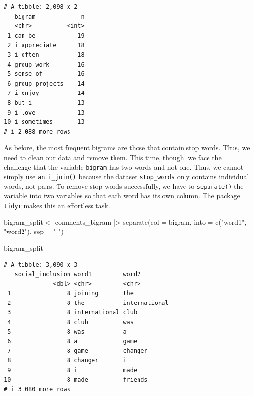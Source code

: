 \documentclass[
  letterpaper,
]{krantz}
\makeatletter
\newenvironment{Shaded}{\begin{snugshade}}{\end{snugshade}}
\newcommand{\AttributeTok}[1]{\textcolor[rgb]{0.40,0.45,0.13}{#1}}
\newcommand{\FunctionTok}[1]{\textcolor[rgb]{0.28,0.35,0.67}{#1}}
\newcommand{\NormalTok}[1]{\textcolor[rgb]{0.00,0.23,0.31}{#1}}
\newcommand{\OtherTok}[1]{\textcolor[rgb]{0.00,0.23,0.31}{#1}}
\newcommand{\SpecialCharTok}[1]{\textcolor[rgb]{0.37,0.37,0.37}{#1}}
\newcommand{\StringTok}[1]{\textcolor[rgb]{0.13,0.47,0.30}{#1}}
\newenvironment{kframe}{%
\medskip{}
\setlength{\fboxsep}{.8em}
 \def\at@end@of@kframe{}%
 \ifinner\ifhmode%
  \def\at@end@of@kframe{\end{minipage}}%
  \begin{minipage}{\columnwidth}%
 \fi\fi%
 \def\FrameCommand##1{\hskip\@totalleftmargin \hskip-\fboxsep
 \colorbox{shadecolor}{##1}\hskip-\fboxsep
     \hskip-\linewidth \hskip-\@totalleftmargin \hskip\columnwidth}%
 \MakeFramed {\advance\hsize-\width
   \@totalleftmargin\z@ \linewidth\hsize
   \@setminipage}}%
 {\par\unskip\endMakeFramed%
 \at@end@of@kframe}
\renewenvironment{Shaded}{\begin{kframe}}{\end{kframe}}
\makeatother
\begin{document}
\begin{verbatim}
# A tibble: 2,098 x 2
   bigram             n
   <chr>          <int>
 1 can be            19
 2 i appreciate      18
 3 i often           18
 4 group work        16
 5 sense of          16
 6 group projects    14
 7 i enjoy           14
 8 but i             13
 9 i love            13
10 i sometimes       13
# i 2,088 more rows
\end{verbatim}

As before, the most frequent bigrams are those that contain stop words.
Thus, we need to clean our data and remove them. This time, though, we
face the challenge that the variable \texttt{bigram} has two words and
not one. Thus, we cannot simply use \texttt{anti\_join()} because the
dataset \texttt{stop\_words} only contains individual words, not pairs.
To remove stop words successfully, we have to \texttt{separate()} the
variable into two variables so that each word has its own column. The
package \texttt{tidyr} makes this an effortless task.

\begin{Shaded}
\begin{Highlighting}[]
\NormalTok{bigram\_split }\OtherTok{\textless{}{-}}
\NormalTok{  comments\_bigram }\SpecialCharTok{|\textgreater{}}
  \FunctionTok{separate}\NormalTok{(}\AttributeTok{col =}\NormalTok{ bigram,}
           \AttributeTok{into =} \FunctionTok{c}\NormalTok{(}\StringTok{"word1"}\NormalTok{, }\StringTok{"word2"}\NormalTok{),}
           \AttributeTok{sep =} \StringTok{" "}\NormalTok{)}

\NormalTok{bigram\_split}
\end{Highlighting}
\end{Shaded}

\begin{verbatim}
# A tibble: 3,090 x 3
   social_inclusion word1         word2        
              <dbl> <chr>         <chr>        
 1                8 joining       the          
 2                8 the           international
 3                8 international club         
 4                8 club          was          
 5                8 was           a            
 6                8 a             game         
 7                8 game          changer      
 8                8 changer       i            
 9                8 i             made         
10                8 made          friends      
# i 3,080 more rows
\end{verbatim}
\end{document}
